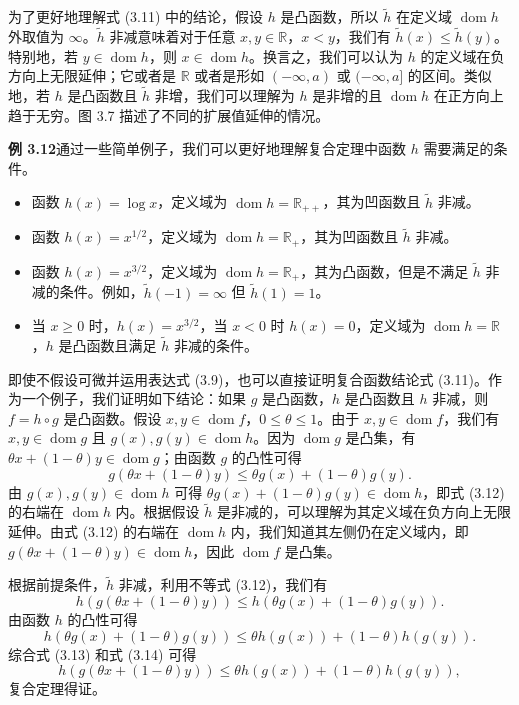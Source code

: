 \documentclass[UTF8, 12pt, fontset=fandol, oneside]{ctexart}
\DeclareMathOperator{\dom}{dom}
\begin{document}
为了更好地理解式 (3.11) 中的结论，假设 $h$ 是凸函数，所以 $\tilde h$ 在定义域 $\dom h$ 外取值为 $\infty$。$\tilde h$ 非减意味着对于任意 $x,y\in\mathbb{R}$，$x<y$，我们有 $\tilde h(x)\leq\tilde h(y)$。特别地，若 $y\in\dom h$，则 $x\in\dom h$。换言之，我们可以认为 $h$ 的定义域在负方向上无限延伸；它或者是 $\mathbb{R}$ 或者是形如 $(-\infty,a)$ 或 $(-\infty,a]$ 的区间。类似地，若 $h$ 是凸函数且 $\tilde h$ 非增，我们可以理解为 $h$ 是非增的且 $\dom h$ 在正方向上趋于无穷。图 3.7 描述了不同的扩展值延伸的情况。

\noindent\textbf{例 3.12}\quad 通过一些简单例子，我们可以更好地理解复合定理中函数 $h$ 需要满足的条件。
\begin{itemize}
\item 函数 $h(x)=\log x$，定义域为 $\dom h=\mathbb{R}_{++}$，其为凹函数且 $\tilde h$ 非减。
\item 函数 $h(x)=x^{1/2}$，定义域为 $\dom h=\mathbb{R}_+$，其为凹函数且 $\tilde h$ 非减。
\item 函数 $h(x)=x^{3/2}$，定义域为 $\dom h=\mathbb{R}_+$，其为凸函数，但是不满足 $\tilde h$ 非减的条件。例如，$\tilde h(-1)=\infty$ 但 $\tilde h(1)=1$。
\item 当 $x\geq0$ 时，$h(x)=x^{3/2}$，当 $x<0$ 时 $h(x)=0$，定义域为 $\dom h=\mathbb{R}$，$h$ 是凸函数且满足 $\tilde h$ 非减的条件。
\end{itemize}

即使不假设可微并运用表达式 (3.9)，也可以直接证明复合函数结论式 (3.11)。作为一个例子，我们证明如下结论：如果 $g$ 是凸函数，$h$ 是凸函数且 $h$ 非减，则 $f=h\circ g$ 是凸函数。假设 $x,y\in\dom f$，$0\leq\theta\leq1$。由于 $x,y\in\dom f$，我们有 $x,y\in\dom g$ 且 $g(x),g(y)\in\dom h$。因为 $\dom g$ 是凸集，有 $\theta x+(1-\theta)y\in\dom g$；由函数 $g$ 的凸性可得
\begin{equation}
g(\theta x+(1-\theta)y)\leq \theta g(x)+(1-\theta)g(y).
\tag{3.12}
\end{equation}
由 $g(x),g(y)\in\dom h$ 可得 $\theta g(x)+(1-\theta)g(y)\in\dom h$，即式 (3.12) 的右端在 $\dom h$ 内。根据假设 $\tilde h$ 是非减的，可以理解为其定义域在负方向上无限延伸。由式 (3.12) 的右端在 $\dom h$ 内，我们知道其左侧仍在定义域内，即 $g(\theta x+(1-\theta)y)\in\dom h$，因此 $\dom f$ 是凸集。

根据前提条件，$\tilde h$ 非减，利用不等式 (3.12)，我们有
\begin{equation}
h(g(\theta x+(1-\theta)y))\leq h(\theta g(x)+(1-\theta)g(y)).
\tag{3.13}
\end{equation}
由函数 $h$ 的凸性可得
\begin{equation}
h(\theta g(x)+(1-\theta)g(y))\leq \theta h(g(x))+(1-\theta)h(g(y)).
\tag{3.14}
\end{equation}
综合式 (3.13) 和式 (3.14) 可得
\[
h(g(\theta x+(1-\theta)y))\leq \theta h(g(x))+(1-\theta)h(g(y)),
\]
复合定理得证。
\end{document}
